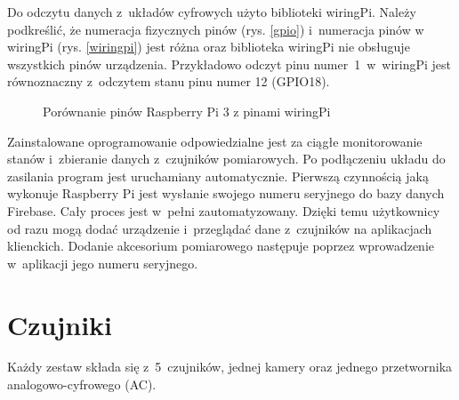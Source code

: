 \documentclass[polish,bachelor,a4paper,oneside]{ppfcmthesis}
\begin{document}
    Do odczytu danych z~układów cyfrowych użyto biblioteki wiringPi. Należy podkreślić, że numeracja fizycznych pinów (rys. \ref{gpio}) i~numeracja pinów w wiringPi (rys. \ref{wiringpi}) jest różna oraz biblioteka wiringPi nie obsługuje wszystkich pinów urządzenia. Przykładowo odczyt pinu numer~1~w~wiringPi jest równoznaczny z~odczytem stanu pinu numer 12 (GPIO18).
    \begin{figure}[H]
        \centering
        \hspace{3cm}
        \caption{Porównanie pinów Raspberry Pi 3 \cite{gpio} z pinami wiringPi \cite{wiringpi}}
        \label{piny}
    \end{figure}

    Zainstalowane oprogramowanie odpowiedzialne jest za ciągłe monitorowanie stanów i~zbieranie danych z~czujników pomiarowych. Po podłączeniu układu do zasilania program jest uruchamiany automatycznie. Pierwszą czynnością jaką wykonuje Raspberry Pi jest wysłanie swojego numeru seryjnego do bazy danych Firebase. Cały proces jest w~pełni zautomatyzowany. Dzięki temu użytkownicy od razu mogą dodać urządzenie i~przeglądać dane z~czujników na aplikacjach klienckich. Dodanie akcesorium pomiarowego następuje poprzez wprowadzenie w~aplikacji jego numeru seryjnego.
    \section{Czujniki}
    Każdy zestaw składa się z~5~czujników, jednej kamery oraz jednego przetwornika analogowo-cyfrowego (AC).
\end{document}
